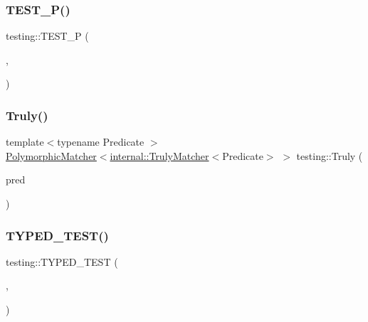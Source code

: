 \mbox{\label{namespacetesting_af05768b7e2f14652d2c4f274ba1a5544}} 
\subsubsection{\texorpdfstring{T\+E\+S\+T\+\_\+\+P()}{TEST\_P()}}
{\footnotesize\ttfamily testing\+::\+T\+E\+S\+T\+\_\+P (\begin{DoxyParamCaption}\item[{\hyperlink{classtesting_1_1_code_location_for_t_e_s_t_p}{Code\+Location\+For\+T\+E\+S\+TP}}]{,  }\item[{Verify}]{ }\end{DoxyParamCaption})}

\mbox{\label{namespacetesting_a5faf05cfaae6074439960048e478b1c8}} 
\subsubsection{\texorpdfstring{Truly()}{Truly()}}
{\footnotesize\ttfamily template$<$typename Predicate $>$ \\
\hyperlink{classtesting_1_1_polymorphic_matcher}{Polymorphic\+Matcher}$<$\hyperlink{classtesting_1_1internal_1_1_truly_matcher}{internal\+::\+Truly\+Matcher}$<$Predicate$>$ $>$ testing\+::\+Truly (\begin{DoxyParamCaption}\item[{Predicate}]{pred }\end{DoxyParamCaption})\hspace{0.3cm}{\ttfamily [inline]}}

\mbox{\label{namespacetesting_a400c572f732b06e836d6b3a5adfc4cf7}} 
\subsubsection{\texorpdfstring{T\+Y\+P\+E\+D\+\_\+\+T\+E\+S\+T()}{TYPED\_TEST()}}
{\footnotesize\ttfamily testing\+::\+T\+Y\+P\+E\+D\+\_\+\+T\+E\+ST (\begin{DoxyParamCaption}\item[{\hyperlink{classtesting_1_1_code_location_for_t_y_p_e_d_t_e_s_t}{Code\+Location\+For\+T\+Y\+P\+E\+D\+T\+E\+ST}}]{,  }\item[{Verify}]{ }\end{DoxyParamCaption})}

